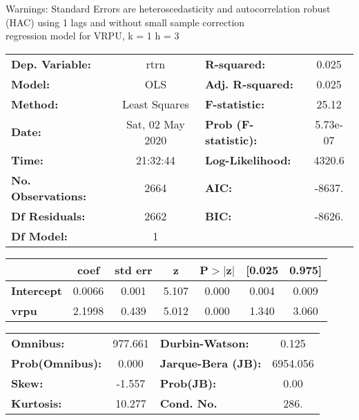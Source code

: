 Warnings: \newline
 [1] Standard Errors are heteroscedasticity and autocorrelation robust (HAC) using 1 lags and without small sample correction\\ 

regression model for VRPU, k = 1 h = 3\begin{center}
\begin{tabular}{lclc}
\toprule
\textbf{Dep. Variable:}    &       rtrn       & \textbf{  R-squared:         } &     0.025   \\
\textbf{Model:}            &       OLS        & \textbf{  Adj. R-squared:    } &     0.025   \\
\textbf{Method:}           &  Least Squares   & \textbf{  F-statistic:       } &     25.12   \\
\textbf{Date:}             & Sat, 02 May 2020 & \textbf{  Prob (F-statistic):} &  5.73e-07   \\
\textbf{Time:}             &     21:32:44     & \textbf{  Log-Likelihood:    } &    4320.6   \\
\textbf{No. Observations:} &        2664      & \textbf{  AIC:               } &    -8637.   \\
\textbf{Df Residuals:}     &        2662      & \textbf{  BIC:               } &    -8626.   \\
\textbf{Df Model:}         &           1      & \textbf{                     } &             \\
\bottomrule
\end{tabular}
\begin{tabular}{lcccccc}
                   & \textbf{coef} & \textbf{std err} & \textbf{z} & \textbf{P$> |$z$|$} & \textbf{[0.025} & \textbf{0.975]}  \\
\midrule
\textbf{Intercept} &       0.0066  &        0.001     &     5.107  &         0.000        &        0.004    &        0.009     \\
\textbf{vrpu}      &       2.1998  &        0.439     &     5.012  &         0.000        &        1.340    &        3.060     \\
\bottomrule
\end{tabular}
\begin{tabular}{lclc}
\textbf{Omnibus:}       & 977.661 & \textbf{  Durbin-Watson:     } &    0.125  \\
\textbf{Prob(Omnibus):} &   0.000 & \textbf{  Jarque-Bera (JB):  } & 6954.056  \\
\textbf{Skew:}          &  -1.557 & \textbf{  Prob(JB):          } &     0.00  \\
\textbf{Kurtosis:}      &  10.277 & \textbf{  Cond. No.          } &     286.  \\
\bottomrule
\end{tabular}
\end{center}

